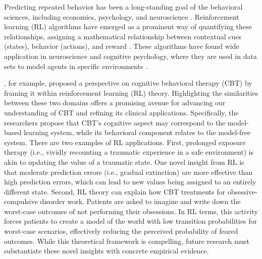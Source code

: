 \documentclass[
  number,
  preprint,
  3p,
  onecolumn]{elsarticle}
\begin{document}
Predicting repeated behavior has been a long-standing goal of the
behavioral sciences, including economics, psychology, and neuroscience
\citep{verplanken2022, venkatesh2023, hagger2023}. Reinforcement
learning (RL) algorithms have emerged as a prominent way of quantifying
these relationships, assigning a mathematical relationship between
contextual cues (states), behavior (actions), and reward
\citep{sutton2018, kaelbling1996}. These algorithms have found wide
application in neuroscience and cognitive psychology, where they are
used in data sets to model agents in specific environments
\citep{zhang2020}.

\citep{niv2022}, for example, proposed a perspective on cognitive
behavioral therapy (CBT) by framing it within reinforcement learning
(RL) theory. Highlighting the similarities between these two domains
offers a promising avenue for advancing our understanding of CBT and
refining its clinical applications. Specifically, the researchers
propose that CBT's cognitive aspect may correspond to the model-based
learning system, while its behavioral component relates to the
model-free system. There are two examples of RL applications. First,
prolonged exposure therapy (i.e., vividly recounting a traumatic
experience in a safe environment) is akin to updating the value of a
traumatic state. One novel insight from RL is that moderate prediction
errors (i.e., gradual extinction) are more effective than high
prediction errors, which can lead to new values being assigned to an
entirely different state. Second, RL theory can explain how CBT
treatments for obsessive-compulsive disorder work. Patients are asked to
imagine and write down the worst-case outcomes of not performing their
obsessions. In RL terms, this activity forces patients to create a model
of the world with low transition probabilities for worst-case scenarios,
effectively reducing the perceived probability of feared outcomes. While
this theoretical framework is compelling, future research must
substantiate these novel insights with concrete empirical evidence.
\end{document}
